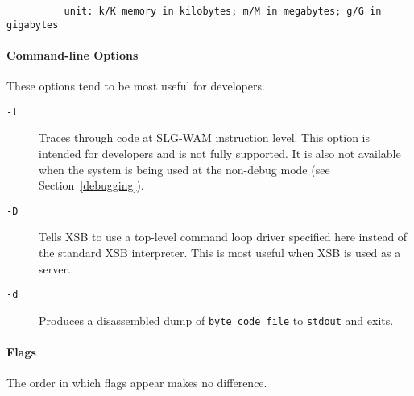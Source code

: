 {\begin{verbatim}
          unit: k/K memory in kilobytes; m/M in megabytes; g/G in gigabytes
\end{verbatim}
}

\paragraph*{Command-line Options}  These options tend to be most useful for developers.

\begin{description}
\item[{\tt -t}] Traces through code at SLG-WAM instruction level.
  This option is intended for developers and is not fully supported.
  It is also not available when the system is being used at the
  non-debug mode (see Section~\ref{debugging}).
\item[{\tt -D}] Tells XSB to use a top-level command loop driver specified
  here instead of the standard XSB interpreter. This is most useful when
 XSB is used as a server.
\item[{\tt -d}] Produces a disassembled dump of {\tt byte\_code\_file} to 
    {\tt stdout} and exits.
\end{description}

\paragraph*{Flags}
The order in which flags appear makes no difference.

